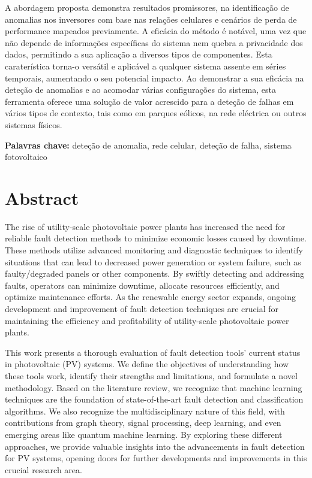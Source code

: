 A abordagem proposta demonstra resultados promissores, na identificação de anomalias nos inversores com base nas relações celulares e cenários de perda de performance mapeados previamente. A eficácia do método é notável, uma vez que não depende de informações específicas do sistema nem quebra a privacidade dos dados, permitindo a sua aplicação a diversos tipos de componentes. Esta caraterística torna-o versátil e aplicável a qualquer sistema assente em séries temporais, aumentando o seu potencial impacto. Ao demonstrar a sua eficácia na deteção de anomalias e ao acomodar várias configurações do sistema, esta ferramenta oferece uma solução de valor acrescido para a deteção de falhas em vários tipos de contexto, tais como em parques eólicos, na rede eléctrica ou outros sistemas físicos.

\bigskip

\textbf{Palavras chave:} deteção de anomalia, rede celular, deteção de falha, sistema fotovoltaico

\chapter*{Abstract}
The rise of utility-scale photovoltaic power plants has increased the need for reliable fault detection methods to minimize economic losses caused by downtime. These methods utilize advanced monitoring and diagnostic techniques to identify situations that can lead to decreased power generation or system failure, such as faulty/degraded panels or other components. By swiftly detecting and addressing faults, operators can minimize downtime, allocate resources efficiently, and optimize maintenance efforts. As the renewable energy sector expands, ongoing development and improvement of fault detection techniques are crucial for maintaining the efficiency and profitability of utility-scale photovoltaic power plants.

This work presents a thorough evaluation of fault detection tools' current status in photovoltaic (PV) systems. We define the objectives of understanding how these tools work, identify their strengths and limitations, and formulate a novel methodology. Based on the literature review, we recognize that machine learning techniques are the foundation of state-of-the-art fault detection and classification algorithms. We also recognize the multidisciplinary nature of this field, with contributions from graph theory, signal processing, deep learning, and even emerging areas like quantum machine learning. By exploring these different approaches, we provide valuable insights into the advancements in fault detection for PV systems, opening doors for further developments and improvements in this crucial research area.

